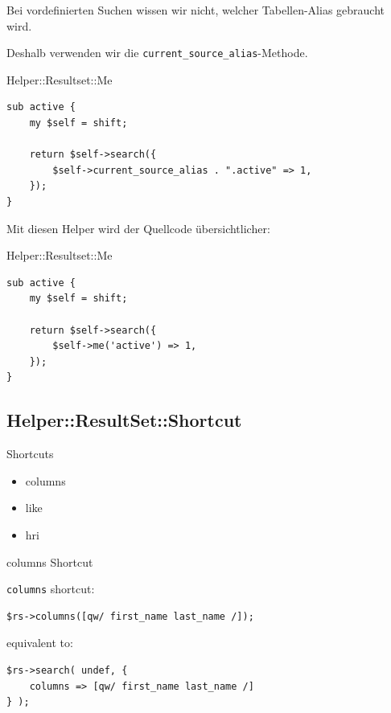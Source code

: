 Bei vordefinierten Suchen wissen wir nicht, welcher Tabellen-Alias
gebraucht wird.

Deshalb verwenden wir die \verb|current_source_alias|-Methode.

\begin{frame}[fragile]{Helper::Resultset::Me}
\begin{lstlisting}
sub active {
    my $self = shift;

    return $self->search({ 
        $self->current_source_alias . ".active" => 1,
    });
}
\end{lstlisting}
\end{frame}

Mit diesen Helper wird der Quellcode übersichtlicher:

\begin{frame}[fragile]{Helper::Resultset::Me}
\begin{lstlisting}
sub active {
    my $self = shift;

    return $self->search({ 
        $self->me('active') => 1,
    });
}
\end{lstlisting}
\end{frame}

\subsection{Helper::ResultSet::Shortcut}




\begin{frame}{Shortcuts}
\begin{itemize}
\item columns
\item like
\item hri
\end{itemize}
\end{frame}

\begin{frame}[fragile]{columns Shortcut}

\verb|columns| shortcut:

\begin{lstlisting}
$rs->columns([qw/ first_name last_name /]);
\end{lstlisting}

equivalent to:

\begin{lstlisting}
$rs->search( undef, { 
    columns => [qw/ first_name last_name /] 
} );
\end{lstlisting}
\end{frame}

